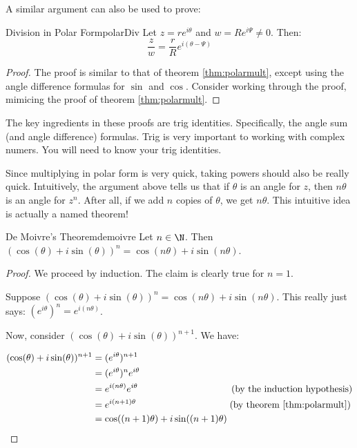 A similar argument can also be used to prove: 

\begin{thmbo}{Division in Polar Form}{polarDiv} 
 Let $z = re^{i\theta}$ and $w = Re^{i\Psi}\ne 0$. Then:
$$\frac{z}{w} = \frac{r}{R}e^{i(\theta - \Psi)}$$
\end{thmbo}

\begin{proof} The proof is similar to that of theorem \ref{thm:polarmult}, except using the angle difference formulas for $\sin$ and $\cos$. Consider working through the proof, mimicing the proof of theorem \ref{thm:polarmult}.\end{proof}

\begin{note} The key ingredients in these proofs are trig identities. Specifically, the angle sum (and angle difference) formulas. Trig is very important to working with complex numers. You will need to know your trig identities. \end{note}

Since multiplying in polar form is very quick, taking powers should also be really quick. Intuitively, the argument above tells us that if $\theta$ is an angle for $z$, then $n\theta$ is an angle for $z^n$. After all, if we add $n$ copies of $\theta$, we get $n\theta$. This intuitive idea is actually a named theorem!

\begin{thmbo}{De Moivre's Theorem}{demoivre} 
Let $n\in \N$. Then $(\cos(\theta) + i\sin(\theta))^n = \cos(n\theta) + i\sin(n\theta)$.
\end{thmbo}

\begin{proof} We proceed by induction. The claim is clearly true for $n = 1$.

Suppose $(\cos(\theta) + i\sin(\theta))^n = \cos(n\theta) + i\sin(n\theta)$. This really just says: $(e^{i\theta})^n = e^{i(n\theta)}$.

Now, consider $(\cos(\theta) + i\sin(\theta))^{n+1}$. We have:

\begin{align*} (\cos(\theta) + i\sin(\theta))^{n+1} &= (e^{i\theta})^{n+1}\\
&= (e^{i\theta})^ne^{i\theta}\\
&= e^{i(n\theta)}e^{i\theta} \qquad\qquad\qquad\qquad \qquad   (\text{by the induction hypothesis})\\
&= e^{i(n+1)\theta} \qquad \qquad\qquad \qquad\qquad 	 	 (\text{by theorem \ref{thm:polarmult}})\\
&= \cos((n+1)\theta) + i\sin((n+1)\theta)
\end{align*}
\end{proof}


